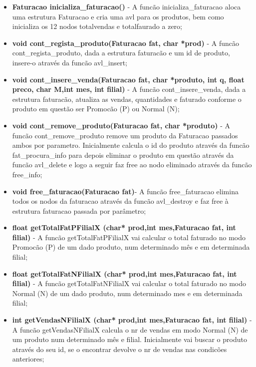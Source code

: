 \begin{itemize}

\item	\textbf{Faturacao inicializa\_faturacao()} - A funcão inicializa\_faturacao aloca uma estrutura Faturacao e cria uma avl para os produtos, bem como inicializa os 12 nodos totalvendas e totalfaurado a zero; 

\item	\textbf{void cont\_regista\_produto(Faturacao fat, char *prod)} - A funcão cont\_regista\_produto, dada a estrutura faturacão e um id de produto, insere-o através da funcão avl\_insert; 

\item	\textbf{void cont\_insere\_venda(Faturacao fat, char *produto, int q, float preco, char M,int mes, int filial)} - A funcão cont\_insere\_venda, dada a estrutura faturacão, atualiza as vendas, quantidades e faturado conforme o produto em questão ser Promocão (P) ou Normal (N); 

\item	\textbf{void cont\_remove\_produto(Faturacao fat, char *produto)} - A funcão cont\_remove\_produto remove um produto da Faturacao passados ambos por parametro. Inicialmente calcula o id do produto através da funcão fat\_procura\_info para depois eliminar o produto em questão através da funcão avl\_delete e logo a seguir faz free ao nodo eliminado através da funcão free\_info;

\item	\textbf{void free\_faturacao(Faturacao fat)}- A funcão free\_faturacao elimina todos os nodos da faturacao através da funcão avl\_destroy e faz free à estrutura faturacao passada por parâmetro;

\item	\textbf{float getTotalFatPFilialX (char* prod,int mes,Faturacao fat, int filial)} - A funcão getTotalFatPFilialX vai calcular o total faturado no modo Promocão (P) de um dado produto, num determinado mês e em determinada filial; 

\item	\textbf{float getTotalFatNFilialX (char* prod,int mes,Faturacao fat, int filial)} - A funcão getTotalFatNFilialX vai calcular o total faturado no modo Normal (N) de um dado produto, num determinado mes e em determinada filial;

\item	\textbf{int getVendasNFilialX (char* prod,int mes,Faturacao fat, int filial)} - A funcão getVendasNFilialX calcula o nr de vendas em modo Normal (N) de um produto num determinado mês e filial. Inicialmente vai buscar o produto através do seu id, se o encontrar devolve o nr de vendas nas condicões anteriores; 


\end{itemize}
